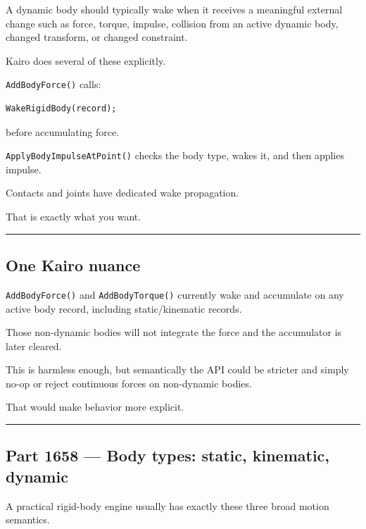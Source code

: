 A dynamic body should typically wake when it receives a meaningful external change such as force, torque, impulse, collision from an active dynamic body, changed transform, or changed constraint.

Kairo does several of these explicitly.

\texttt{AddBodyForce()} calls:

\begin{verbatim}
WakeRigidBody(record);
\end{verbatim}

before accumulating force.

\texttt{ApplyBodyImpulseAtPoint()} checks the body type, wakes it, and then applies impulse.

Contacts and joints have dedicated wake propagation.

That is exactly what you want.

\begin{center}\rule{0.5\linewidth}{0.5pt}\end{center}

\subsection{One Kairo nuance}\label{06-engine-ii-ch037-one-kairo-nuance}

\texttt{AddBodyForce()} and \texttt{AddBodyTorque()} currently wake and accumulate on any active body record, including static/kinematic records.

Those non-dynamic bodies will not integrate the force and the accumulator is later cleared.

This is harmless enough, but semantically the API could be stricter and simply no-op or reject continuous forces on non-dynamic bodies.

That would make behavior more explicit.

\begin{center}\rule{0.5\linewidth}{0.5pt}\end{center}

\subsection{Part 1658 --- Body types: static, kinematic, dynamic}\label{06-engine-ii-ch037-part-1658-body-types-static-kinematic-dynamic}

A practical rigid-body engine usually has exactly these three broad motion semantics.

